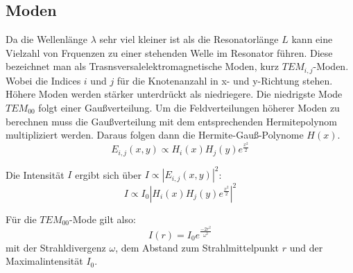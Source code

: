 \subsection{Moden}
\label{sec:Moden}
Da die Wellenlänge $\lambda$ sehr viel kleiner ist als die Resonatorlänge $L$ kann eine Vielzahl von Frquenzen
zu einer stehenden Welle im Resonator führen. Diese bezeichnet man als Trasnsversalelektromagnetische Moden,
kurz $TEM_{i,j}$-Moden. Wobei die Indices $i$ und $j$ für die Knotenanzahl in x- und y-Richtung stehen.
Höhere Moden werden stärker unterdrückt als niedriegere. Die niedrigste Mode $TEM_{00}$ folgt einer Gaußverteilung.
Um die Feldverteilungen höherer Moden zu berechnen muss die Gaußverteilung mit dem entsprechenden
Hermitepolynom multipliziert werden. Daraus folgen dann die Hermite-Gauß-Polynome $H(x)$.
\begin{equation}
    E_{i,j}(x,y)\propto H_i(x)H_j(y)e^{\frac{x^2}{2}}
\end{equation}

Die Intensität $I$ ergibt sich über $I\propto |E_{i,j}(x,y)|^2$:
\begin{equation}
    I\propto I_0|H_i(x)H_j(y)e^{\frac{x^2}{2}}|^2
\end{equation}

Für die $TEM_{00}$-Mode gilt also:
\begin{equation}
    I(r)=I_0e^{\frac{-2r^2}{\omega^2}}
\end{equation}
mit der Strahldivergenz $\omega$, dem Abstand zum Strahlmittelpunkt $r$ und der Maximalintensität $I_0$.
